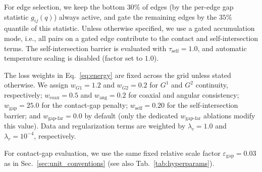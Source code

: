 \documentclass{ieeeaccess}
\begin{document}
For edge selection, we keep the bottom $30\%$ of edges (by the per-edge gap statistic
$g_{ij}(q)$) always active, and gate the remaining edges by the $35\%$ quantile of this statistic.
Unless otherwise specified, we use a gated accumulation mode, i.e., all pairs on a gated edge
contribute to the contact and self-intersection terms.
The self-intersection barrier is evaluated with
$\tau_{\mathrm{self}} = 1.0$, and automatic temperature scaling is disabled
(factor set to $1.0$).

The loss weights in Eq.~\eqref{eq:energy} are fixed across the grid unless
stated otherwise. We assign $w_{G1} = 1.2$ and
$w_{G2} = 0.2$ for $G^1$ and $G^2$ continuity, respectively;
$w_{\text{coax}} = 0.5$ and
$w_{\text{ang}} = 0.2$ for coaxial and angular consistency;
$w_{\text{gap}} = 25.0$ for the contact-gap penalty;
$w_{\text{self}} = 0.20$ for the self-intersection
barrier; and $w_{\text{gap-far}} = 0.0$ by default
(only the dedicated $w_{\text{gap-far}}$ ablations modify this value).
Data and regularization terms are weighted by
$\lambda_c = 1.0$ and
$\lambda_r = 10^{-4}$, respectively.

For contact-gap evaluation, we use the same fixed relative scale factor
$\varepsilon_{\mathrm{gap}} = 0.03$ as in Sec.~\ref{sec:unit_conventions}
(see also Tab.~\ref{tab:hyperparams}).
\end{document}
